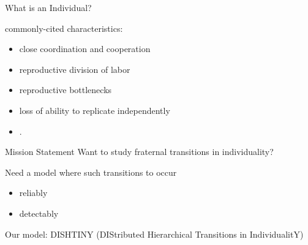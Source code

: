 \begin{frame}{What is an Individual?}

commonly-cited characteristics:
\begin{itemize}
\item close coordination and cooperation
\item reproductive division of labor
\item reproductive bottlenecks
\item loss of ability to replicate independently
\item \cite{ereshefsky2015rethinking, bouchard2013symbiotic}.
\end{itemize}

\end{frame}

\begin{frame}{Mission Statement}
Want to study fraternal transitions in individuality?

\pause
\vspace{2ex}

Need a model where such transitions to occur
\begin{itemize}
\item reliably
\item detectably
\end{itemize}

\pause
\vspace{2ex}

Our model: DISHTINY \footnotesize{(DIStributed Hierarchical Transitions in IndividualitY)}

\end{frame}
